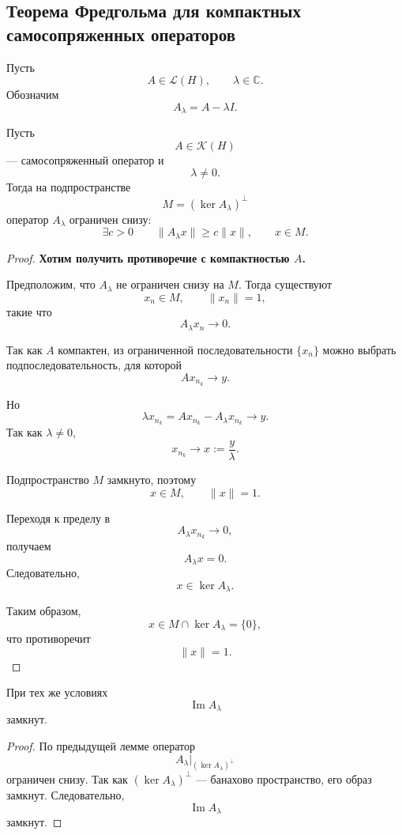\subsection{Теорема Фредгольма для компактных самосопряженных операторов}

\begin{definition}
	Пусть
	\[
	A\in\mathcal L(H),
	\qquad
	\lambda\in\mathbb C.
	\]
	Обозначим
	\[
	A_\lambda=A-\lambda I.
	\]
\end{definition}

\begin{lemma}
	Пусть
	\[
	A\in\mathcal K(H)
	\]
	--- самосопряженный оператор и
	\[
	\lambda\neq0.
	\]
	Тогда на подпространстве
	\[
	M=(\ker A_\lambda)^\perp
	\]
	оператор \(A_\lambda\) ограничен снизу:
	\[
	\exists c>0
	\qquad
	\|A_\lambda x\|\geq c\|x\|,
	\qquad x\in M.
	\]
\end{lemma}

\begin{proof}
	\textbf{Хотим получить противоречие с компактностью \(A\).}
	
	Предположим, что \(A_\lambda\) не ограничен снизу на \(M\).
	Тогда существуют
	\[
	x_n\in M,
	\qquad
	\|x_n\|=1,
	\]
	такие что
	\[
	A_\lambda x_n\to0.
	\]
	
	Так как \(A\) компактен, из ограниченной последовательности \(\{x_n\}\)
	можно выбрать подпоследовательность, для которой
	\[
	Ax_{n_k}\to y.
	\]
	
	Но
	\[
	\lambda x_{n_k}
	=
	Ax_{n_k}-A_\lambda x_{n_k}
	\to y.
	\]
	Так как \(\lambda\neq0\),
	\[
	x_{n_k}\to x:=\frac{y}{\lambda}.
	\]
	
	Подпространство \(M\) замкнуто, поэтому
	\[
	x\in M,
	\qquad
	\|x\|=1.
	\]
	
	Переходя к пределу в
	\[
	A_\lambda x_{n_k}\to0,
	\]
	получаем
	\[
	A_\lambda x=0.
	\]
	Следовательно,
	\[
	x\in\ker A_\lambda.
	\]
	
	Таким образом,
	\[
	x\in M\cap\ker A_\lambda=\{0\},
	\]
	что противоречит
	\[
	\|x\|=1.
	\]
\end{proof}

\begin{lemma}
	При тех же условиях
	\[
	\operatorname{Im}A_\lambda
	\]
	замкнут.
\end{lemma}

\begin{proof}
	По предыдущей лемме оператор
	\[
	A_\lambda|_{(\ker A_\lambda)^\perp}
	\]
	ограничен снизу. Так как \((\ker A_\lambda)^\perp\) --- банахово пространство,
	его образ замкнут. Следовательно,
	\[
	\operatorname{Im}A_\lambda
	\]
	замкнут.
\end{proof}

